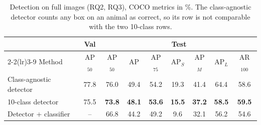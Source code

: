 \begin{table}[H]
\centering
\caption{Detection on full images (RQ2, RQ3), COCO metrics in \%. The class-agnostic detector counts any box on an animal as correct, so its row is not comparable with the two 10-class rows.}
\label{tab:detection}
\begin{threeparttable}
\small
\begin{tabular}{lcccccccc}
\toprule
 & Val & \multicolumn{7}{c}{Test} \\
\cmidrule(lr){2-2}\cmidrule(lr){3-9}
Method & AP$_{50}$ & AP$_{50}$ & AP & AP$_{75}$ & AP$_S$ & AP$_M$ & AP$_L$ & AR$_{100}$ \\
\midrule
Class-agnostic detector & 77.8 & 76.0 & 49.4 & 54.2 & 19.3 & 41.4 & 64.4 & 58.6 \\
\midrule
10-class detector & 75.5 & \textbf{73.8} & \textbf{48.1} & \textbf{53.6} & \textbf{15.5} & \textbf{37.2} & \textbf{58.5} & \textbf{59.5} \\
Detector + classifier & -- & 66.8 & 44.2 & 49.2 & \phantom{0}9.6 & 32.1 & 56.2 & 54.6 \\
\bottomrule
\end{tabular}
\end{threeparttable}
\end{table}
